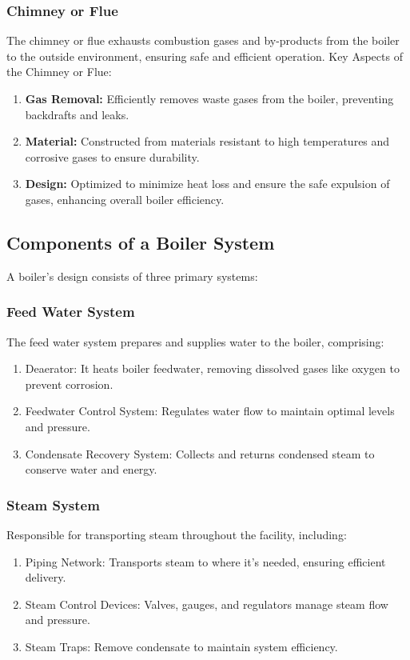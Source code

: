 \subsubsection{Chimney or Flue}
The chimney or flue exhausts combustion gases and by-products from the boiler to the outside environment, ensuring safe and efficient operation.
Key Aspects of the Chimney or Flue:
\begin{enumerate}
    \item \textbf{Gas Removal:} Efficiently removes waste gases from the boiler, preventing backdrafts and leaks.
    \item \textbf{Material:} Constructed from materials resistant to high temperatures and corrosive gases to ensure durability.
    \item \textbf{Design:} Optimized to minimize heat loss and ensure the safe expulsion of gases, enhancing overall boiler efficiency.
\end{enumerate}


\subsection{Components of a Boiler System}
A boiler's design consists of three primary systems:
\subsubsection{Feed Water System}
The feed water system prepares and supplies water to the boiler, comprising:
\begin{enumerate}
\item Deaerator: It heats boiler feedwater, removing dissolved gases like oxygen to prevent corrosion.
\item Feedwater Control System: Regulates water flow to maintain optimal levels and pressure.
\item Condensate Recovery System: Collects and returns condensed steam to conserve water and energy.

\end{enumerate}
\subsubsection{Steam System}
Responsible for transporting steam throughout the facility, including:
\begin{enumerate}
\item Piping Network: Transports steam to where it's needed, ensuring efficient delivery.
\item Steam Control Devices: Valves, gauges, and regulators manage steam flow and pressure.
\item Steam Traps: Remove condensate to maintain system efficiency.
    
\end{enumerate}

